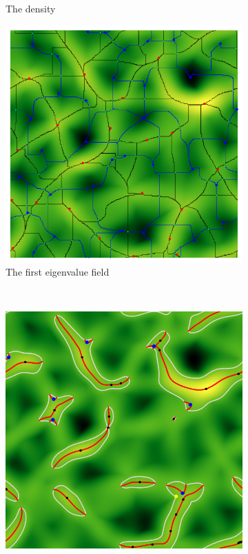 \documentclass[a4paper, 11pt]{article}
\begin{document}
\begin{figure}
\begin{subfigure}[b]{0.32\textwidth}
\caption{The density}
\label{fig:dens_MS}
\end{subfigure}
\begin{subfigure}[b]{0.32\textwidth}
\includegraphics[width=\textwidth]{Visual_eigen1}
\caption{The first eigenvalue field}
\label{fig:eigen1_MS}
\end{subfigure}\\
\begin{subfigure}[b]{0.32\textwidth}
\includegraphics[width=\textwidth]{Visual_Lambda1_D=1}

\end{subfigure}
\end{figure}
\end{document}
